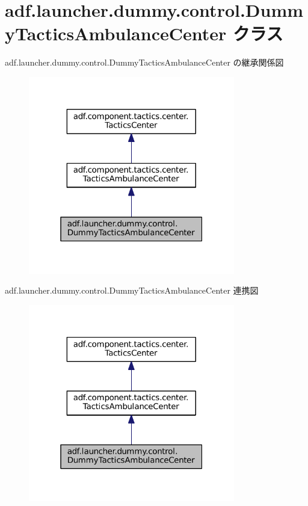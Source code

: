 \hypertarget{classadf_1_1launcher_1_1dummy_1_1control_1_1DummyTacticsAmbulanceCenter}{}\section{adf.\+launcher.\+dummy.\+control.\+Dummy\+Tactics\+Ambulance\+Center クラス}
\label{classadf_1_1launcher_1_1dummy_1_1control_1_1DummyTacticsAmbulanceCenter}


adf.\+launcher.\+dummy.\+control.\+Dummy\+Tactics\+Ambulance\+Center の継承関係図
\nopagebreak
\begin{figure}[H]
\begin{center}
\leavevmode
\includegraphics[width=256pt]{classadf_1_1launcher_1_1dummy_1_1control_1_1DummyTacticsAmbulanceCenter__inherit__graph}
\end{center}
\end{figure}


adf.\+launcher.\+dummy.\+control.\+Dummy\+Tactics\+Ambulance\+Center 連携図
\nopagebreak
\begin{figure}[H]
\begin{center}
\leavevmode
\includegraphics[width=256pt]{classadf_1_1launcher_1_1dummy_1_1control_1_1DummyTacticsAmbulanceCenter__coll__graph}
\end{center}
\end{figure}
